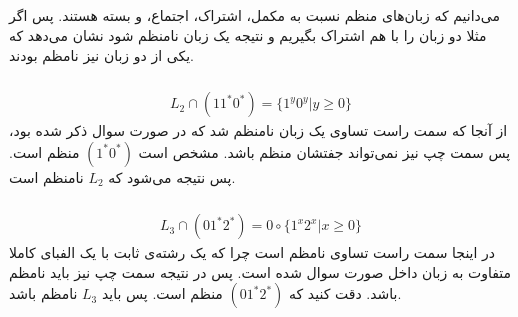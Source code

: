 \subsection{}
می‌دانیم که زبان‌های منظم نسبت به مکمل، اشتراک، اجتماع،
 و 
بسته هستند. پس اگر مثلا دو زبان را با هم اشتراک بگیریم و نتیجه یک زبان نامنظم شود نشان می‌دهد که
یکی از دو زبان نیز نامظم بودند.
\subsubsection{}
\begin{gather*}
    L_2 \cap (11^* 0^*) = \{1^y 0^y | y \ge 0\}
\end{gather*}
از آنجا که سمت راست تساوی یک زبان نامنظم شد که در صورت سوال ذکر شده بود، پس سمت چپ نیز نمی‌تواند جفتشان
منظم باشد. مشخص است
$(1^* 0^*)$
منظم است. پس نتیجه می‌شود که
$L_2$
نامنظم است.
\subsubsection{}
\begin{gather*}
    L_3 \cap (0 1^* 2^*) = 0 \circ \{1^x 2^x | x \ge 0\}
\end{gather*}
در اینجا سمت راست تساوی نامظم است چرا که یک رشته‌ی ثابت با یک الفبای کاملا متفاوت به زبان داخل صورت سوال
شده است. پس در نتیجه سمت چپ نیز باید نامظم باشد. دقت کنید که 
$(0 1^* 2^*)$
منظم است. پس باید
$L_3$
نامظم باشد.
